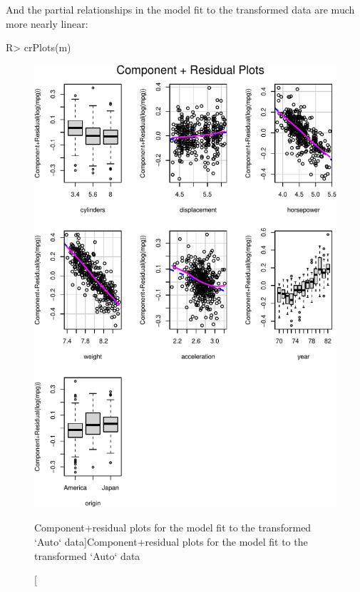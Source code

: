 \documentclass[
]{jss}
\begin{document}
And the partial relationships in the model fit to the transformed data
are much more nearly linear:

\begin{CodeChunk}
\begin{CodeInput}
R> crPlots(m)
\end{CodeInput}
\begin{figure}

{\centering \includegraphics[width=1\linewidth]{JSS-article_files/figure-latex/Auto-CR-plots-transformed-1} 

}

\caption[Component+residual plots for the model fit to the transformed `Auto` data]{Component+residual plots for the model fit to the transformed `Auto` data}\label{fig:Auto-CR-plots-transformed}
\end{figure}
\end{CodeChunk}
\end{document}
